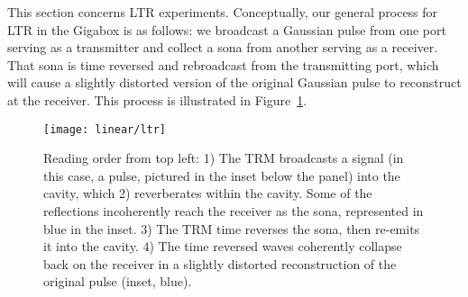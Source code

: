 This section concerns LTR experiments. Conceptually, our general process for LTR in the Gigabox is as follows: we broadcast a Gaussian pulse from one port serving as a transmitter and collect a sona from another serving as a receiver. That sona is time reversed and rebroadcast from the transmitting port, which will cause a slightly distorted version of the original Gaussian pulse to reconstruct at the receiver. This process is illustrated in Figure~\ref{fig:linear-ltr}.


\begin{figure}[h!]
\centering
\texttt{[image: linear/ltr]}
    \caption[ltr]{Reading order from top left: 1) The TRM broadcasts a signal (in this case, a pulse, pictured in the inset below the panel) into the cavity, which 2) reverberates within the cavity. Some of the reflections incoherently reach the receiver as the sona, represented in blue in the inset. 3) The TRM time reverses the sona, then re-emits it into the cavity. 4) The time reversed waves coherently collapse back on the receiver in a slightly distorted reconstruction of the original pulse (inset, blue).}
    \label{fig:linear-ltr}
\end{figure}

